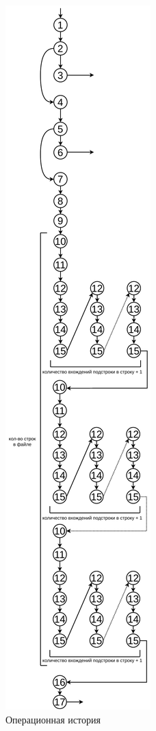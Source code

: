 \begin{figure}[h]
	\centering
	\includegraphics[height=0.95\textheight]{img/ОИ.pdf}
	\caption{Операционная история}
	\label{fig:g3}
\end{figure}

